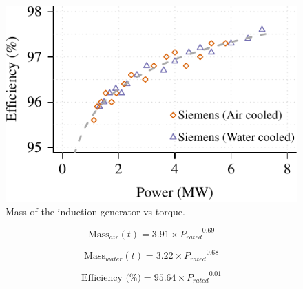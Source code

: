 \documentclass{article}
\begin{document}
\begin{knitrout}
\color{fgcolor}\begin{figure}[]

\includegraphics[width=\maxwidth]{figure/induction_generator_eeficiency} \caption[Mass of the induction generator vs torque]{Mass of the induction generator vs torque.\label{fig:induction_generator_eeficiency}}
\end{figure}


\end{knitrout}


\begin{equation}
  \text{Mass}_{air}(t) = 3.91 \times {P_{rated}}^{0.69}
\end{equation}

\begin{equation}
  \text{Mass}_{water}(t) = 3.22 \times {P_{rated}}^{0.68}
\end{equation}

\begin{equation}
\text{Efficiency (\%)} = 95.64 \times {P_{rated}}^{0.01}
\end{equation}
\end{document}
